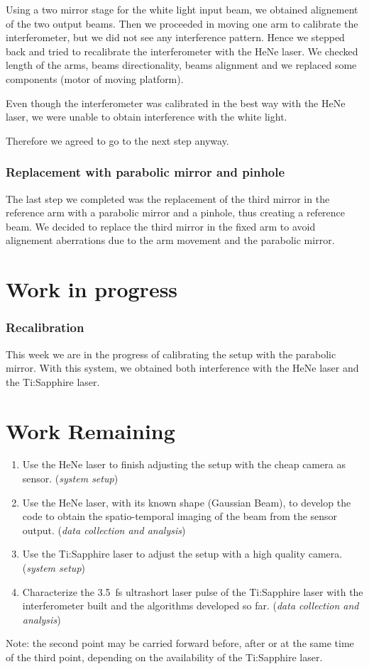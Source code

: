 \documentclass[12pt,a4paper]{report}
\begin{document}
Using a two mirror stage for the white light input beam, we obtained alignement of the two output beams.
Then we proceeded in moving one arm to calibrate the interferometer, but we did not see any interference pattern.
Hence we stepped back and tried to recalibrate the interferometer with the HeNe laser.
We checked length of the arms, beams directionality, beams alignment and we replaced some components (motor of moving platform).

Even though the interferometer was calibrated in the best way with the HeNe laser, we were unable to obtain interference with the white light.

Therefore we agreed to go to the next step anyway.

\subsubsection*{Replacement with parabolic mirror and pinhole}
The last step we completed was the replacement of the third mirror in the reference arm with a parabolic mirror and a pinhole, thus creating a reference beam.
We decided to replace the third mirror in the fixed arm to avoid alignement aberrations due to the arm movement and the parabolic mirror.


\section*{Work in progress}
\subsubsection*{Recalibration}
This week we are in the progress of calibrating the setup with the parabolic mirror.
With this system, we obtained both interference with the HeNe laser and the Ti:Sapphire laser.

\section*{Work Remaining}
\begin{enumerate}
\item Use the HeNe laser to finish adjusting the setup with the cheap camera as sensor. (\textit{system setup})
\item Use the HeNe laser, with its known shape (Gaussian Beam), to develop the code to obtain the spatio-temporal imaging of the beam from the sensor output. (\textit{data collection and analysis})
\item Use the Ti:Sapphire laser to adjust the setup with a high quality camera. (\textit{system setup})
\item Characterize the \SI{3.5}{\fs} ultrashort laser pulse of the Ti:Sapphire laser with the interferometer built and the algorithms developed so far. (\textit{data collection and analysis})
\end{enumerate}
Note: the second point may be carried forward before, after or at the same time of the third point, depending on the availability of the Ti:Sapphire laser.
\end{document}
